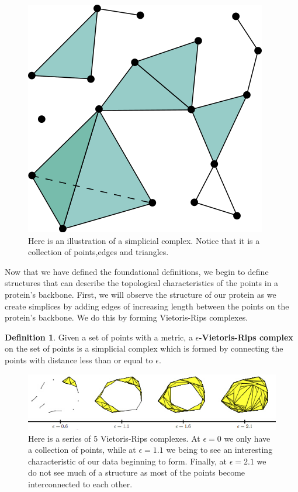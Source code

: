 \documentclass[12pt, a4paper, twocolumn, fullpage]{article}
\theoremstyle{plain}
\theoremstyle{definition}
\newtheorem{defn}{Definition}[section]
\theoremstyle{remark}
\begin{document}
\begin{figure}[t]
    \includegraphics[width=\linewidth]{img/mathDef/simpcomplex}
    \caption{Here is an illustration of a simplicial complex. Notice that it is a collection of points,edges and triangles.}
    \label{simpcomplex}
\end{figure}

Now that we have defined the foundational definitions, we begin to define structures that can describe the topological characteristics of the points in a protein's backbone. First, we will observe the structure of our protein as we create simplices by adding edges of increasing length between the points on the protein's backbone. We do this by forming Vietoris-Rips complexes.

\begin{defn}
Given a set of points with a metric, a \textbf{$\epsilon$-Vietoris-Rips complex} on the set of points is a simplicial complex which is formed by connecting the points with distance less than or equal to $\epsilon$.
\end{defn}


\begin{figure}[t]
    \includegraphics[width=\linewidth]{img/mathDef/ripscomplex.png}
    \caption{Here is a series of 5 Vietoris-Rips complexes. At $\epsilon=0$ we only have a collection of points, while at $\epsilon=1.1$ we being to see an interesting characteristic of our data beginning to form. Finally, at $\epsilon=2.1$ we do not see much of a structure as most of the points become interconnected to each other. }
    \label{}
\end{figure}
\end{document}
